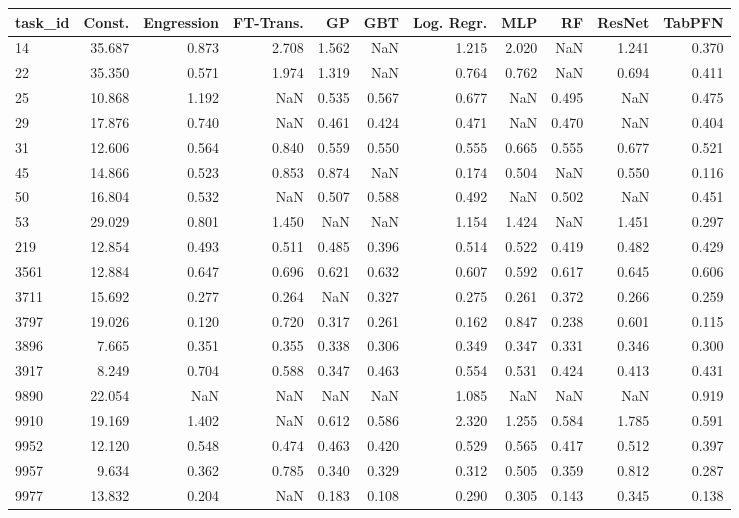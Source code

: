 \begin{tabular}{lrrrrrrrrrr}
\toprule
task\_id & Const. & Engression & FT-Trans. & GP & GBT & Log. Regr. & MLP & RF & ResNet & TabPFN \\
\midrule
14 & 35.687 & 0.873 & 2.708 & 1.562 & NaN & 1.215 & 2.020 & NaN & 1.241 & 0.370 \\
22 & 35.350 & 0.571 & 1.974 & 1.319 & NaN & 0.764 & 0.762 & NaN & 0.694 & 0.411 \\
25 & 10.868 & 1.192 & NaN & 0.535 & 0.567 & 0.677 & NaN & 0.495 & NaN & 0.475 \\
29 & 17.876 & 0.740 & NaN & 0.461 & 0.424 & 0.471 & NaN & 0.470 & NaN & 0.404 \\
31 & 12.606 & 0.564 & 0.840 & 0.559 & 0.550 & 0.555 & 0.665 & 0.555 & 0.677 & 0.521 \\
45 & 14.866 & 0.523 & 0.853 & 0.874 & NaN & 0.174 & 0.504 & NaN & 0.550 & 0.116 \\
50 & 16.804 & 0.532 & NaN & 0.507 & 0.588 & 0.492 & NaN & 0.502 & NaN & 0.451 \\
53 & 29.029 & 0.801 & 1.450 & NaN & NaN & 1.154 & 1.424 & NaN & 1.451 & 0.297 \\
219 & 12.854 & 0.493 & 0.511 & 0.485 & 0.396 & 0.514 & 0.522 & 0.419 & 0.482 & 0.429 \\
3561 & 12.884 & 0.647 & 0.696 & 0.621 & 0.632 & 0.607 & 0.592 & 0.617 & 0.645 & 0.606 \\
3711 & 15.692 & 0.277 & 0.264 & NaN & 0.327 & 0.275 & 0.261 & 0.372 & 0.266 & 0.259 \\
3797 & 19.026 & 0.120 & 0.720 & 0.317 & 0.261 & 0.162 & 0.847 & 0.238 & 0.601 & 0.115 \\
3896 & 7.665 & 0.351 & 0.355 & 0.338 & 0.306 & 0.349 & 0.347 & 0.331 & 0.346 & 0.300 \\
3917 & 8.249 & 0.704 & 0.588 & 0.347 & 0.463 & 0.554 & 0.531 & 0.424 & 0.413 & 0.431 \\
9890 & 22.054 & NaN & NaN & NaN & NaN & 1.085 & NaN & NaN & NaN & 0.919 \\
9910 & 19.169 & 1.402 & NaN & 0.612 & 0.586 & 2.320 & 1.255 & 0.584 & 1.785 & 0.591 \\
9952 & 12.120 & 0.548 & 0.474 & 0.463 & 0.420 & 0.529 & 0.565 & 0.417 & 0.512 & 0.397 \\
9957 & 9.634 & 0.362 & 0.785 & 0.340 & 0.329 & 0.312 & 0.505 & 0.359 & 0.812 & 0.287 \\
9977 & 13.832 & 0.204 & NaN & 0.183 & 0.108 & 0.290 & 0.305 & 0.143 & 0.345 & 0.138 \\

\end{tabular}
